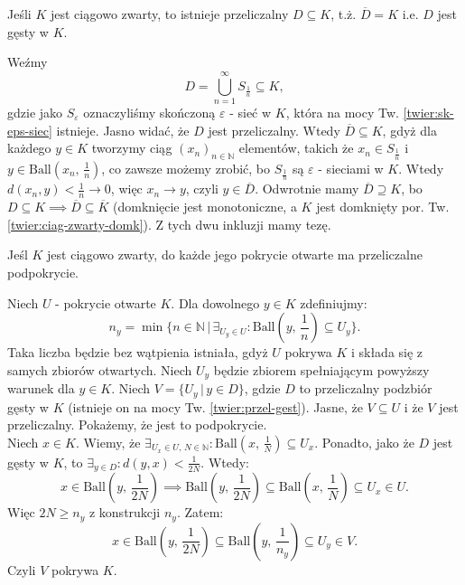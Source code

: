 \documentclass{article}
\newcounter{defi}
\numberwithin{defi}{section}
\numberwithin{defi}{section}
\newcommand{\N}{\mathbb{N}}
\newcommand{\oo}{\infty}
\providecommand{\eps}{\varepsilon}
\newcommand{\ciag}[1]{(#1_{n})_{n \in \N}}
\newcommand{\ball}[2]{\text{Ball}(#1, \, #2)}
\begin{document}
    \begin{twier}{} \label{twier:przel-gest}
        Jeśli $K$ jest ciągowo zwarty, to istnieje przeliczalny $D \subseteq K$, t.ż. $\overline{D} = K$ i.e. $D$ jest gęsty w $K$.
    \end{twier}

    \begin{dow}
        Weźmy \begin{equation*}
            D = \bigcup_{n = 1}^{\oo} S_{\frac{1}{n}} \subseteq K,
        \end{equation*} gdzie jako $S_\eps$ oznaczyliśmy skończoną $\eps$ - sieć w $K$, która na mocy Tw. \ref{twier:sk-eps-siec} istnieje. Jasno widać, że $D$ jest przeliczalny. Wtedy $\overline{D} \subseteq K$, gdyż dla każdego $y \in K$ tworzymy ciąg $\ciag{x}$ elementów, takich że $x_n \in S_{\frac{1}{n}}$ i $y \in \ball{x_n}{\frac{1}{n}}$, co zawsze możemy zrobić, bo $S_\frac{1}{n}$ są $\eps$ - sieciami w $K$. Wtedy $d(x_n, y) < \frac{1}{n} \to 0$, więc $x_n \to y$, czyli $y 
        \in \overline{D}$. Odwrotnie mamy $\overline{D} \supseteq K$, bo $D \subseteq K \implies \overline{D} \subseteq \overline{K}$ (domknięcie jest monotoniczne, a $K$ jest domknięty por. Tw. \ref{twier:ciag-zwarty-domk}). Z tych dwu inkluzji mamy tezę. 
    \end{dow}



    \begin{twier}{} \label{twier:przel_podpokr}
        Jeśl $K$ jest ciągowo zwarty, do każde jego pokrycie otwarte ma przeliczalne podpokrycie. 
    \end{twier}

    \begin{dow}
        Niech $U$ - pokrycie otwarte $K$. Dla dowolnego $y \in K$ zdefiniujmy:\begin{equation*}
            n_y = \min\{ n \in \N \, | \, \exists_{U_y \in U}: \ball{y}{\frac{1}{n}} \subseteq U_y \}.
        \end{equation*}  Taka liczba będzie bez wątpienia istniała, gdyż $U$ pokrywa $K$ i składa się z samych zbiorów otwartych. Niech $U_y$ będzie zbiorem spełniającym powyższy warunek dla $y \in K$. Niech $V = \{ U_y \, | \, y \in D \}$, gdzie $D$ to przeliczalny podzbiór gęsty w $K$ (istnieje on na mocy Tw. \ref{twier:przel-gest}). Jasne, że $V \subseteq U$ i że $V$ jest przeliczalny. Pokażemy, że jest to podpokrycie. \\ 
        Niech $x \in K$. Wiemy, że $\exists_{U_x \in U, \, N \in \N}: \ball{x}{\frac{1}{N}} \subseteq U_x$. Ponadto, jako że $D$ jest gęsty w $K$, to $\exists_{y \in D}: d(y, x) < \frac{1}{2N}$. Wtedy: \begin{equation*}
            x \in \ball{y}{\frac{1}{2N}} \implies \ball{y}{\frac{1}{2N}} \subseteq \ball{x}{\frac{1}{N}} \subseteq U_x \in U.
        \end{equation*} Więc $2N \geqslant n_y$ z konstrukcji $n_y$. Zatem: \begin{equation*}
            x \in \ball{y}{\frac{1}{2N}} \subseteq \ball{y}{\frac{1}{n_y}} \subseteq U_y \in V.
        \end{equation*} Czyli $V$ pokrywa $K$.
    \end{dow}
\end{document}
